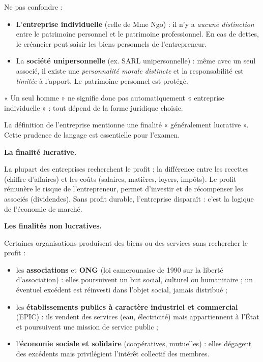 \documentclass[11pt]{article}
\newcommand{\cle}[1]{{\popxbold\color{popdark}#1}}
\newcounter{popsec}
\newcounter{popsub}
\newcommand{\courssub}[1]{%
  \stepcounter{popsub}%
  \par\vspace{9pt}\noindent{\popxbold\fontsize{11.5}{13}\selectfont\color{popink}{\color{poporange}\thepopsec.\thepopsub}\hspace{6pt}#1}\par\nopagebreak\vspace{4pt}
}
\begin{document}
\begin{attention}
Ne pas confondre :
\begin{itemize}
\item L'\textbf{entreprise individuelle} (celle de Mme Ngo) : il n'y a \emph{aucune distinction} entre le patrimoine personnel et le patrimoine professionnel. En cas de dettes, le créancier peut saisir les biens personnels de l'entrepreneur.
\item La \textbf{société unipersonnelle} (ex. SARL unipersonnelle) : même avec un seul associé, il existe une \emph{personnalité morale distincte} et la responsabilité est \emph{limitée} à l'apport. Le patrimoine personnel est protégé.
\end{itemize}
« Un seul homme » ne signifie donc pas automatiquement « entreprise individuelle » : tout dépend de la forme juridique choisie.
\end{attention}

\courssub{La finalité : lucrative ou non ?}

La définition de l'entreprise mentionne une finalité « généralement lucrative ». Cette prudence de langage est essentielle pour l'examen.

\textbf{La finalité lucrative.}\par
La plupart des entreprises recherchent le \cle{profit} : la différence entre les recettes (chiffre d'affaires) et les coûts (salaires, matières, loyers, impôts). Le profit rémunère le risque de l'entrepreneur, permet d'investir et de récompenser les associés (dividendes). Sans profit durable, l'entreprise disparaît : c'est la logique de l'économie de marché.

\textbf{Les finalités non lucratives.}\par
Certaines organisations produisent des biens ou des services sans rechercher le profit :
\begin{itemize}
\item les \textbf{associations} et \textbf{ONG} (loi camerounaise de 1990 sur la liberté d'association) : elles poursuivent un but social, culturel ou humanitaire ; un éventuel excédent est réinvesti dans l'objet social, jamais distribué ;
\item les \textbf{établissements publics à caractère industriel et commercial} (EPIC) : ils vendent des services (eau, électricité) mais appartiennent à l'État et poursuivent une mission de service public ;
\item l'\textbf{économie sociale et solidaire} (coopératives, mutuelles) : elles dégagent des excédents mais privilégient l'intérêt collectif des membres.
\end{itemize}
\end{document}
